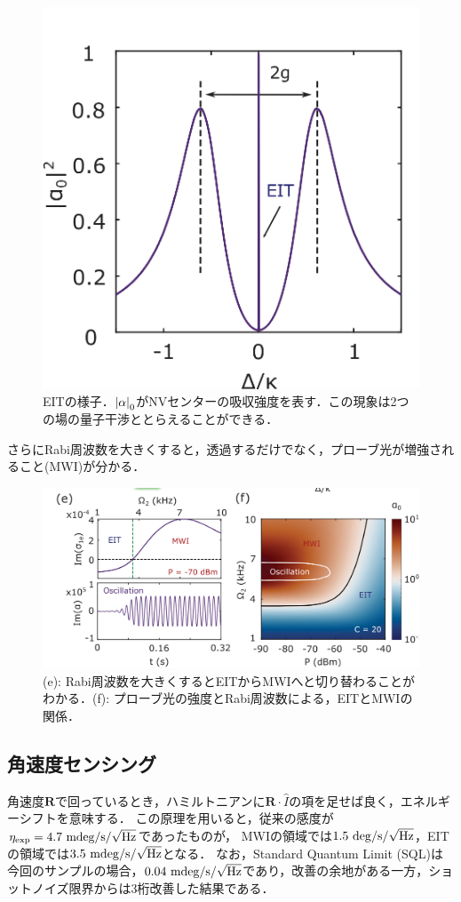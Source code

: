 \documentclass{report}
\begin{document}
        \begin{figure}[H]
          \centering
          \includegraphics[width = 0.5\linewidth]{./src/Cavity-Enhanced_Solid-State_Nuclear_Spin_Gyroscope/1_d.png}
          \caption{EITの様子．$\abs{\alpha}_0$がNVセンターの吸収強度を表す．この現象は2つの場の量子干渉ととらえることができる．}
        \end{figure}
        さらにRabi周波数を大きくすると，透過するだけでなく，プローブ光が増強されること(MWI)が分かる．
        \begin{figure}[H]
          \centering
          \includegraphics[width = 0.5\linewidth]{./src/Cavity-Enhanced_Solid-State_Nuclear_Spin_Gyroscope/1_e_d.png}
          \caption{(e): Rabi周波数を大きくするとEITからMWIへと切り替わることがわかる．(f): プローブ光の強度とRabi周波数による，EITとMWIの関係．}
        \end{figure}
      \subsection{角速度センシング}
        角速度$\bm{R}$で回っているとき，ハミルトニアンに$\bm{R}\cdot \hat{I}$の項を足せば良く，エネルギーシフトを意味する．
        この原理を用いると，従来の感度が$\eta_{\mathrm{exp}} = 4.7\ \mathrm{mdeg / s / \sqrt{Hz}}$であったものが，
        MWIの領域では$1.5\ \mathrm{deg / s / \sqrt{Hz}}$，EITの領域では$3.5\ \mathrm{mdeg / s / \sqrt{Hz}}$となる．
        なお，Standard Quantum Limit (SQL)は今回のサンプルの場合，$0.04\ \mathrm{mdeg / s / \sqrt{Hz}}$であり，改善の余地がある一方，ショットノイズ限界からは3桁改善した結果である．
\end{document}
